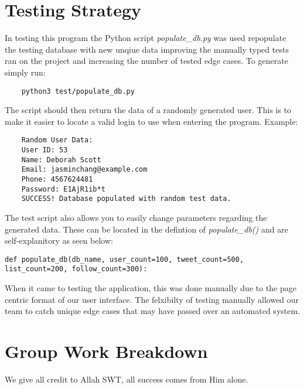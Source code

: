 \documentclass[12pt]{article}
\begin{document}
\newpage

\section{Testing Strategy}
In testing this program the Python script \textit{populate\_db.py} was used repopulate the testing database with 
new unqiue data improving the manually typed tests ran on the project and increasing the number of tested edge 
cases. To generate simply run:
\begin{verbatim}
	python3 test/populate_db.py
\end{verbatim}
The script should then return the data of a randomly generated user. This is to make it easier to locate a valid
login to use when entering the program. Example: 
\begin{verbatim}
	Random User Data:
	User ID: 53
	Name: Deborah Scott
	Email: jasminchang@example.com
	Phone: 4567624481
	Password: E1AjR1ib*t
	SUCCESS! Database populated with random test data.
\end{verbatim}
The test script also allows you to easily change parameters regarding the generated data. These can be located in the
defintion of \textit{populate\_db()} and are self-explanitory as seen below:
\begin{lstlisting}
def populate_db(db_name, user_count=100, tweet_count=500, list_count=200, follow_count=300):
\end{lstlisting}
When it came to testing the application, this was done manually due to the page centric format of our user interface. 
The felxibilty of testing manually allowed our team to catch unique edge cases that may have passed over an automated
system.
\newpage


\section{Group Work Breakdown}
We give all credit to Allah SWT, all success comes from Him alone.
\end{document}
